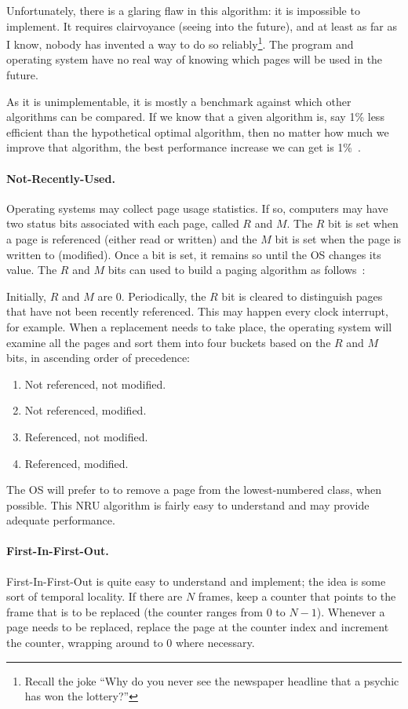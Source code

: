 Unfortunately, there is a glaring flaw in this algorithm: it is impossible to implement. It requires clairvoyance (seeing into the future), and at least as far as I know, nobody has invented a way to do so reliably\footnote{Recall the joke ``Why do you never see the newspaper headline that a psychic has won the lottery?''}. The program and operating system have no real way of knowing which pages will be used in the future.

As it is unimplementable, it is mostly a benchmark against which other algorithms can be compared. If we know that a given algorithm is, say 1\% less efficient than the hypothetical optimal algorithm, then no matter how much we improve that algorithm, the best performance increase we can get is 1\%~\cite{mos}.

\paragraph{Not-Recently-Used.}
Operating systems may collect page usage statistics. If so, computers may have two status bits associated with each page, called $R$ and $M$. The $R$ bit is set when a page is referenced (either read or written) and the $M$ bit is set when the page is written to (modified). Once a bit is set, it remains so until the OS changes its value. The $R$ and $M$ bits can used to build a paging algorithm as follows~\cite{mos}:

Initially, $R$ and $M$ are 0. Periodically, the $R$ bit is cleared to distinguish pages that have not been recently referenced. This may happen every clock interrupt, for example. When a replacement needs to take place, the operating system will examine all the pages and sort them into four buckets based on the $R$ and $M$ bits, in ascending order of precedence:

\begin{enumerate}
	\item Not referenced, not modified.
	\item Not referenced, modified.
	\item Referenced, not modified.
	\item Referenced, modified.
\end{enumerate}

The OS will prefer to to remove a page from the lowest-numbered class, when possible. This NRU algorithm is fairly easy to understand and may provide adequate performance.

\paragraph{First-In-First-Out.}
First-In-First-Out is quite easy to understand and implement; the idea is some sort of temporal locality. If there are $N$ frames, keep a counter that points to the frame that is to be replaced (the counter ranges from $0$ to $N-1$). Whenever a page needs to be replaced, replace the page at the counter index and increment the counter, wrapping around to 0 where necessary.

